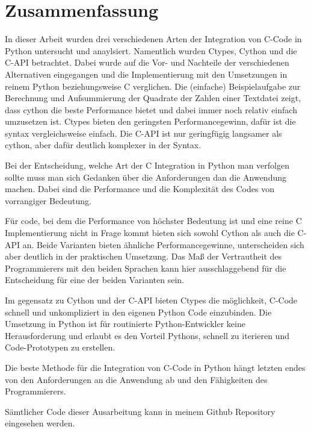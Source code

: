 \documentclass[a4paper, parskip=half]{scrartcl}
\begin{document}
\section{Zusammenfassung}


In dieser Arbeit wurden drei verschiedenen Arten der Integration von C-Code in Python untersucht und anaylsiert. Namentlich wurden Ctypes, Cython und die C-API betrachtet. Dabei wurde auf die Vor- und Nachteile der verschiedenen Alternativen eingegangen und die Implementierung mit den Umsetzungen in reinem Python beziehungsweise C verglichen. 
Die (einfache) Beispielaufgabe zur Berechnung und Aufsummierung der Quadrate der Zahlen einer Textdatei zeigt, dass cython die beste Performance bietet und dabei immer noch relativ einfach umzusetzen ist. Ctypes bieten den geringsten Performancegewinn, dafür ist die syntax vergleichsweise einfach. Die C-API ist nur geringfügig langsamer als cython, aber dafür deutlich komplexer in der Syntax. 

Bei der Entscheidung, welche Art der C Integration in Python man verfolgen sollte muss man sich Gedanken über die Anforderungen dan die Anwendung machen. Dabei sind die Performance und die Komplexität des Codes von vorrangiger Bedeutung. 

Für code, bei dem die Performance von höchster Bedeutung ist und eine reine C Implementierung nicht in Frage kommt bieten sich sowohl Cython als auch die C-API an. Beide Varianten bieten ähnliche Performancegewinne, unterscheiden sich aber deutlich in der praktischen Umsetzung. Das Maß der Vertrautheit des Programmierers mit den beiden Sprachen kann hier ausschlaggebend für die Entscheidung für eine der beiden Varianten sein.

Im gegensatz zu Cython und der C-API bieten Ctypes die möglichkeit, C-Code schnell und unkompliziert in den eigenen Python Code einzubinden. Die Umsetzung in Python ist für routinierte Python-Entwickler keine Herausforderung und erlaubt es den Vorteil Pythons, schnell zu iterieren und Code-Prototypen zu erstellen.

Die beste Methode für die Integration von C-Code in Python hängt letzten endes von den Anforderungen an die Anwendung ab und den Fähigkeiten des Programmierers. 

Sämtlicher Code dieser Ausarbeitung kann in meinem Github Repository eingesehen werden. \cite{my_github}

\newpage
\printbibliography
\end{document}
